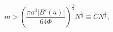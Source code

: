 \begin{equation}
\label{Eq_A11}
m > \left(\frac{\pi a^3 |B'(a)|}{64 \Phi} \right)^{\frac{1}{3}}
  N^{\frac{1}{3}} \equiv CN^{\frac{1}{3}},
\end{equation}

